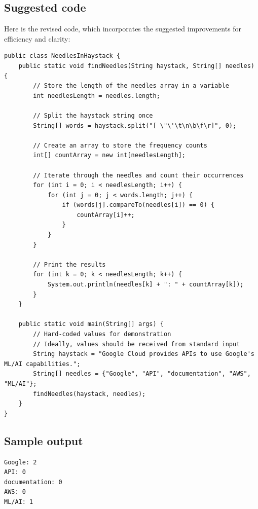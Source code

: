 \documentclass{article}
\begin{document}
\subsection*{Suggested code}

Here is the revised code, which incorporates the suggested improvements for efficiency and clarity:

\begin{lstlisting}[style=java]
public class NeedlesInHaystack {
    public static void findNeedles(String haystack, String[] needles) {
        // Store the length of the needles array in a variable
        int needlesLength = needles.length;
        
        // Split the haystack string once
        String[] words = haystack.split("[ \"\'\t\n\b\f\r]", 0);
        
        // Create an array to store the frequency counts
        int[] countArray = new int[needlesLength];

        // Iterate through the needles and count their occurrences
        for (int i = 0; i < needlesLength; i++) {
            for (int j = 0; j < words.length; j++) {
                if (words[j].compareTo(needles[i]) == 0) {
                    countArray[i]++;
                }
            }
        }

        // Print the results
        for (int k = 0; k < needlesLength; k++) {
            System.out.println(needles[k] + ": " + countArray[k]);
        }
    }

    public static void main(String[] args) {
        // Hard-coded values for demonstration
        // Ideally, values should be received from standard input
        String haystack = "Google Cloud provides APIs to use Google's ML/AI capabilities.";
        String[] needles = {"Google", "API", "documentation", "AWS", "ML/AI"};
        findNeedles(haystack, needles);
    }
}
\end{lstlisting}

\subsection*{Sample output}

\begin{lstlisting}
Google: 2
API: 0
documentation: 0
AWS: 0
ML/AI: 1
\end{lstlisting}
\end{document}
